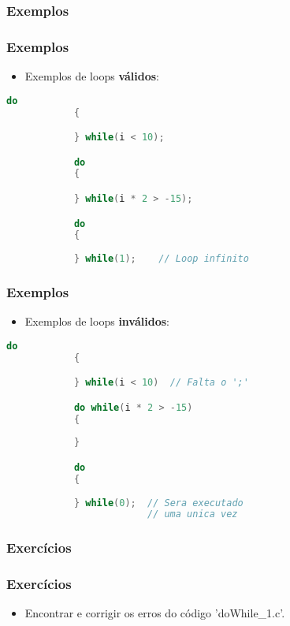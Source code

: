 \subsubsection{Exemplos}

\begin{frame}[fragile]
    \frametitle{Exemplos}
    
        \begin{itemize}
            
            \item Exemplos de loops \textbf{válidos}:
    
        \end{itemize}
    
        \begin{lstlisting}[language=C]
            do
            {

            } while(i < 10);

            do
            {

            } while(i * 2 > -15);

            do
            {
                
            } while(1);    // Loop infinito
        \end{lstlisting}
    
\end{frame}




\begin{frame}[fragile]
    \frametitle{Exemplos}
    
        \begin{itemize}
            
            \item Exemplos de loops \textbf{inválidos}:
    
        \end{itemize}
    
        \begin{lstlisting}[language=C]
            do
            {

            } while(i < 10)  // Falta o ';'

            do while(i * 2 > -15)
            {
                
            }

            do
            {
                
            } while(0);  // Sera executado 
                         // uma unica vez
        \end{lstlisting}
    
\end{frame}




\subsubsection{Exercícios}

\begin{frame}[fragile]
\frametitle{Exercícios}
    
    \begin{itemize}
        
        \item Encontrar e corrigir os erros do código 'doWhile\_1.c'.

    \end{itemize}
    
\end{frame}
